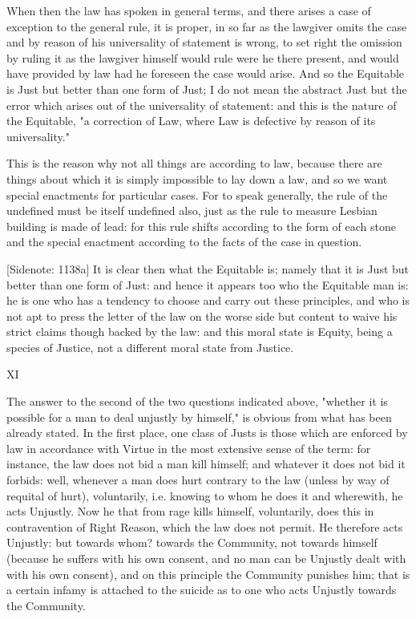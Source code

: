 When then the law has spoken in general terms, and there arises a
case of exception to the general rule, it is proper, in so far as the
lawgiver omits the case and by reason of his universality of statement
is wrong, to set right the omission by ruling it as the lawgiver himself
would rule were he there present, and would have provided by law had he
foreseen the case would arise. And so the Equitable is Just but better
than one form of Just; I do not mean the abstract Just but the error
which arises out of the universality of statement: and this is the
nature of the Equitable, "a correction of Law, where Law is defective by
reason of its universality."

This is the reason why not all things are according to law, because
there are things about which it is simply impossible to lay down a law,
and so we want special enactments for particular cases. For to speak
generally, the rule of the undefined must be itself undefined also, just
as the rule to measure Lesbian building is made of lead: for this rule
shifts according to the form of each stone and the special enactment
according to the facts of the case in question.

[Sidenote: 1138a] It is clear then what the Equitable is; namely that it
is Just but better than one form of Just: and hence it appears too who
the Equitable man is: he is one who has a tendency to choose and carry
out these principles, and who is not apt to press the letter of the law
on the worse side but content to waive his strict claims though backed
by the law: and this moral state is Equity, being a species of Justice,
not a different moral state from Justice.

XI

The answer to the second of the two questions indicated above, "whether
it is possible for a man to deal unjustly by himself," is obvious from
what has been already stated. In the first place, one class of Justs is
those which are enforced by law in accordance with Virtue in the most
extensive sense of the term: for instance, the law does not bid a man
kill himself; and whatever it does not bid it forbids: well, whenever a
man does hurt contrary to the law (unless by way of requital of hurt),
voluntarily, i.e. knowing to whom he does it and wherewith, he acts
Unjustly. Now he that from rage kills himself, voluntarily, does this
in contravention of Right Reason, which the law does not permit. He
therefore acts Unjustly: but towards whom? towards the Community, not
towards himself (because he suffers with his own consent, and no man can
be Unjustly dealt with with his own consent), and on this principle the
Community punishes him; that is a certain infamy is attached to the
suicide as to one who acts Unjustly towards the Community.

